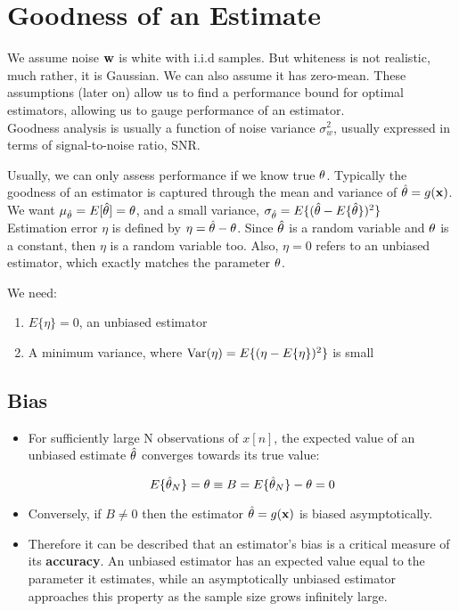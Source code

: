 \section{Goodness of an Estimate}

We assume noise $\mathbf{w}$ is white with i.i.d samples. But whiteness is not realistic, much rather, it is Gaussian. We can also assume it has zero-mean. These assumptions (later on) allow us to find a performance bound for optimal estimators, allowing us to gauge performance of an estimator.\\

Goodness analysis is usually a function of noise variance $\sigma_w^2$, usually expressed in terms of signal-to-noise ratio, SNR.

Usually, we can only assess performance if we know true $\theta$. Typically the goodness of an estimator is captured through the mean and variance of $\hat{\theta} = g(\mathbf{x})$. \\

We want $\mu_{\hat{\theta}} = E[\hat{\theta}] = \theta$, and a small variance, $\sigma_{\hat{\theta}} = E\{(\hat{\theta} - E \{\hat{\theta}\})^2\}$\\

Estimation error $\eta$ is defined by $\eta = \hat{\theta} - \theta$. Since $\hat{\theta}$ is a random variable and $\theta$ is a constant, then $\eta$ is a random variable too. Also, $\eta =0$ refers to an unbiased estimator, which exactly matches the parameter $\theta$.

We need:
\begin{enumerate}
    \item $E\{\eta\} = 0$, an unbiased estimator
    \item A minimum variance, where $\text{Var}(\eta)=E\{(\eta-E\{\eta\})^2\}$ is small
\end{enumerate}

\subsection{Bias}

\begin{itemize}
\item For sufficiently large N observations of $x[n]$, the expected value of an unbiased estimate $\hat{\theta}$ converges towards its true value:

\begin{equation}
    E\{\hat{\theta}_N\} = \theta \equiv B =  E\{\hat{\theta}_N\}- \theta =0
\end{equation}

\item Conversely, if $B\neq 0$ then the estimator $\hat{\theta} = g(\mathbf{x})$ is biased asymptotically.
\item Therefore it can be described that an estimator's bias is a critical measure of its \textbf{accuracy}. An unbiased estimator has an expected value equal to the parameter it estimates, while an asymptotically unbiased estimator approaches this property as the sample size grows infinitely large.
\end{itemize}

